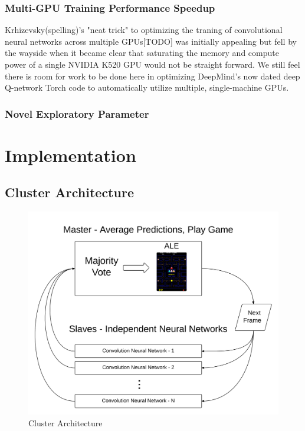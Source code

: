 \documentclass{article} %
\begin{document}
\subsubsection*{Multi-GPU Training Performance Speedup}
Krhizevsky(spelling)'s "neat trick" to optimizing the traning of convolutional neural networks
across multiple GPUs[TODO] was initially appealing but fell by the wayside when it became clear 
that saturating the memory and compute power of a single NVIDIA K520 GPU would not be straight 
forward. We still feel there is room for work to be done here in optimizing DeepMind's now dated
deep Q-network Torch code to automatically utilize multiple, single-machine GPUs.

\subsubsection*{Novel Exploratory Parameter}

\section{Implementation}

\subsection{Cluster Architecture}

\begin{figure}[H]
\begin{center}
\includegraphics[width=1.0\textwidth]{arch}
\end{center}
\caption{Cluster Architecture}
\end{figure}
\end{document}
